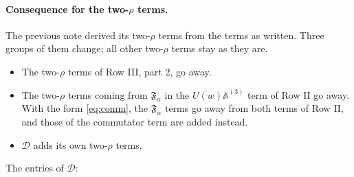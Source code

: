 \documentclass[10pt]{article}
\numberwithin{equation}{section}
\begin{document}
\paragraph{Consequence for the two-$\rho$ terms.} The previous note derived its two-$\rho$ terms from the terms as written. Three groups of them change; all other two-$\rho$ terms stay as they are.
\begin{itemize}
\item The two-$\rho$ terms of Row III, part 2, go away.
\item The two-$\rho$ terms coming from $\mathfrak F_\alpha$ in the $U(w)\mathbb A^{(3)}$ term of Row II go away. With the form \eqref{eq:comm}, the $\mathfrak F_\alpha$ terms go away from both terms of Row II, and those of the commutator term are added instead.
\item $\mathcal D$ adds its own two-$\rho$ terms.
\end{itemize}

The entries of $\mathcal D$:
\end{document}
